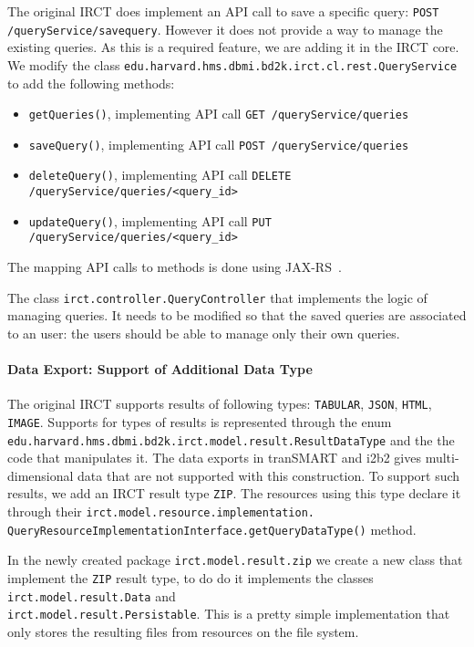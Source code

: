 The original IRCT does implement an API call to save a specific query: \verb|POST /queryService/savequery|.
However it does not provide a way to manage the existing queries.
As this is a required feature, we are adding it in the IRCT core.
We modify the class \verb|edu.harvard.hms.dbmi.bd2k.irct.cl.rest.QueryService| to add the following methods:
\begin{itemize}
    \item \verb|getQueries()|, implementing API call \verb|GET /queryService/queries|
    \item \verb|saveQuery()|, implementing API call \verb|POST /queryService/queries|
    \item \verb|deleteQuery()|, implementing API call \verb|DELETE /queryService/queries/<query_id>|
    \item \verb|updateQuery()|, implementing API call \verb|PUT /queryService/queries/<query_id>|
\end{itemize}

The mapping API calls to methods is done using JAX-RS~\cite{wiki:jaxrs}.

The class \verb|irct.controller.QueryController| that implements the logic of managing queries.
It needs to be modified so that the saved queries are associated to an user: the users should be able to manage only their own queries.

\paragraph{Data Export: Support of Additional Data Type}

The original IRCT supports results of following types: \verb|TABULAR|, \verb|JSON|, \verb|HTML|, \verb|IMAGE|.
Supports for types of results is represented through the enum \verb|edu.harvard.hms.dbmi.bd2k.irct.model.result.ResultDataType| and the the code that manipulates it.
The data exports in tranSMART and i2b2 gives multi-dimensional data that are not supported with this construction.
To support such results, we add an IRCT result type \verb|ZIP|.
The resources using this type declare it through their \verb|irct.model.resource.implementation.| \\
\verb|QueryResourceImplementationInterface.getQueryDataType()| method.

In the newly created package \verb|irct.model.result.zip| we create a new class that implement the \verb|ZIP| result type, to do do it implements the classes
\verb|irct.model.result.Data| and \\
\verb|irct.model.result.Persistable|.
This is a pretty simple implementation that only stores the resulting files from resources on the file system.

